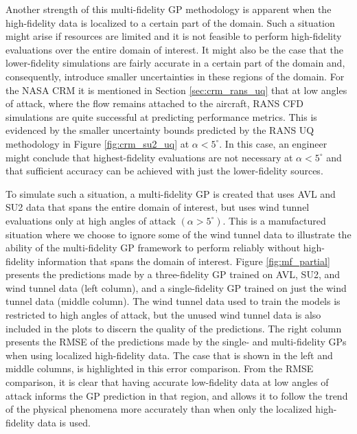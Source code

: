 Another strength of this multi-fidelity GP methodology is apparent when the high-fidelity data is localized to a certain part of the domain. Such a situation might arise if resources are limited and it is not feasible to perform high-fidelity evaluations over the entire domain of interest. It might also be the case that the lower-fidelity simulations are fairly accurate in a certain part of the domain and, consequently, introduce smaller uncertainties in these regions of the domain. For the NASA CRM it is mentioned in Section \ref{sec:crm_rans_uq} that at low angles of attack, where the flow remains attached to the aircraft, RANS CFD simulations are quite successful at predicting performance metrics. This is evidenced by the smaller uncertainty bounds predicted by the RANS UQ methodology in Figure \ref{fig:crm_su2_uq} at $\alpha < 5^\circ$. In this case, an engineer might conclude that highest-fidelity evaluations are not necessary at $\alpha < 5^\circ$ and that sufficient accuracy can be achieved with just the lower-fidelity sources. 

To simulate such a situation, a multi-fidelity GP is created that uses AVL and SU2 data that spans the entire domain of interest, but uses wind tunnel evaluations only at high angles of attack $(\alpha > 5^\circ)$. This is a manufactured situation where we choose to ignore some of the wind tunnel data to illustrate the ability of the multi-fidelity GP framework to perform reliably without high-fidelity information that spans the domain of interest. Figure \ref{fig:mf_partial} presents the predictions made by a three-fidelity GP trained on AVL, SU2, and wind tunnel data (left column), and a single-fidelity GP trained on just the wind tunnel data (middle column). The wind tunnel data used to train the models is restricted to high angles of attack, but the unused wind tunnel data is also included in the plots to discern the quality of the predictions. The right column presents the RMSE of the predictions made by the single- and multi-fidelity GPs when using localized high-fidelity data. The case that is shown in the left and middle columns, is highlighted in this error comparison. From the RMSE comparison, it is clear that having accurate low-fidelity data at low angles of attack informs the GP prediction in that region, and allows it to follow the trend of the physical phenomena more accurately than when only the localized high-fidelity data is used. 

